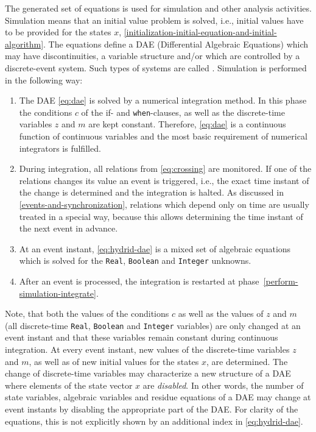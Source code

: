 The generated set of equations is used for simulation and other analysis activities.
Simulation means that an initial value problem is solved, i.e., initial values have to be provided for the states $x$, \cref{initialization-initial-equation-and-initial-algorithm}.
The equations define a DAE (Differential Algebraic Equations) which may have discontinuities, a variable structure and/or which are controlled by a discrete-event system.
Such types of systems are called .
Simulation is performed in the following way:
\begin{enumerate}
\item\label{perform-simulation-integrate}
  The DAE \eqref{eq:dae} is solved by a numerical integration method.
  In this phase the conditions $c$ of the if- and \lstinline!when!-clauses, as well as the discrete-time variables $z$ and $m$ are kept constant.
  Therefore, \eqref{eq:dae} is a continuous function of continuous variables and the most basic requirement of numerical integrators is fulfilled.
\item
  During integration, all relations from \eqref{eq:crossing} are monitored.
  If one of the relations changes its value an event is triggered, i.e., the exact time instant of the change is determined and the integration is halted.
  As discussed in \cref{events-and-synchronization}, relations which depend only on time are usually treated in a special way, because this allows determining the time instant of the next event in advance.
\item
  At an event instant, \eqref{eq:hydrid-dae} is a mixed set of algebraic equations which is solved for the \lstinline!Real!, \lstinline!Boolean! and \lstinline!Integer! unknowns.
\item
  After an event is processed, the integration is restarted at phase~\ref{perform-simulation-integrate}.
\end{enumerate}

Note, that both the values of the conditions $c$ as well as the values of $z$ and $m$ (all discrete-time \lstinline!Real!, \lstinline!Boolean! and \lstinline!Integer! variables) are only changed at an event instant and that these variables remain constant during continuous integration.
At every event instant, new values of the discrete-time variables $z$ and $m$, as well as of new initial values for the states $x$, are determined.
The change of discrete-time variables may characterize a new structure of a DAE where elements of the state vector $x$ are \emph{disabled}.
In other words, the number of state variables, algebraic variables and residue equations of a DAE may change at event instants by disabling the appropriate part of the DAE.
For clarity of the equations, this is not explicitly shown by an additional index in \eqref{eq:hydrid-dae}.

